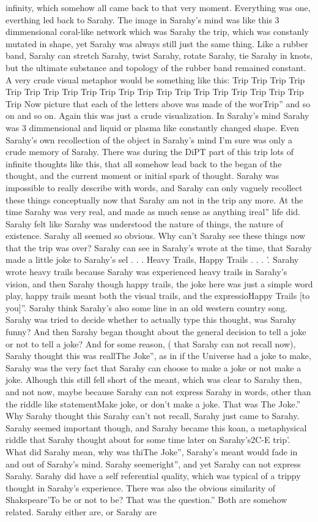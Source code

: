\documentclass[12pt]{book}
\begin{document}
infinity, which somehow all came back to that very moment. Everything was one, everthing led back to Sarahy. The image in Sarahy's mind was like this 3 dimmensional coral-like network which was Sarahy the trip, which was constanly mutated in shape, yet Sarahy was always still just the same thing. Like a rubber band, Sarahy can stretch Sarahy, twist Sarahy, rotate Sarahy, tie Sarahy in knots, but the ultimate substance and topology of the rubber band remained constant. A very crude visual metaphor would be something like this: Trip Trip Trip Trip Trip Trip Trip Trip Trip Trip Trip Trip Trip Trip Trip Trip Trip Trip Trip Trip Trip Now picture that each of the letters above was made of the worTrip'' and so on and so on. Again this was just a crude visualization. In Sarahy's mind Sarahy was 3 dimmensional and liquid or plasma like constantly changed shape. Even Sarahy's own recollection of the object in Sarahy's mind I'm sure was only a crude memory of Sarahy. There was during the DiPT part of this trip lots of infinite thoughts like this, that all somehow lead back to the began of the thought, and the current moment or initial spark of thought. Sarahy was impossible to really describe with words, and Sarahy can only vaguely recollect these things conceptually now that Sarahy am not in the trip any more. At the time Sarahy was very real, and made as much sense as anything ireal'' life did. Sarahy felt like Sarahy was understood the nature of things, the nature of existence. Sarahy all seemed so obvious. Why can't Sarahy see these things now that the trip was over? Sarahy can see in Sarahy's wrote at the time, that Sarahy made a little joke to Sarahy's sel . . .  Heavy Trails, Happy Trails . . . '. Sarahy wrote heavy trails because Sarahy was experienced heavy trails in Sarahy's vision, and then Sarahy though happy trails, the joke here was just a simple word play, happy trails meant both the visual trails, and the expressioHappy Trails [to you]''. Sarahy think Sarahy's also some line in an old western country song. Sarahy was tried to decide whether to actually type this thought, was Sarahy funny? And then Sarahy began thought about the general decision to tell a joke or not to tell a joke? And for some reason, ( that Sarahy can not recall now), Sarahy thought this was reallThe Joke'', as in if the Universe had a joke to make, Sarahy was the very fact that Sarahy can choose to make a joke or not make a joke. Alhough this still fell short of the meant, which was clear to Sarahy then, and not now, maybe because Sarahy can not express Sarahy in words, other than the riddle like statementMake joke, or don't make a joke. That was The Joke.'' Why Sarahy thought this Sarahy can't not recall, Sarahy just came to Sarahy. Sarahy seemed important though, and Sarahy became this koan, a metaphysical riddle that Sarahy thought about for some time later on Sarahy's2C-E trip'. What did Sarahy mean, why was thiThe Joke'', Sarahy's meant would fade in and out of Sarahy's mind. Sarahy seemeright'', and yet Sarahy can not express Sarahy. Sarahy did have a self referential quality, which was typical of a trippy thought in Sarahy's experience. There was also the obvious similarity of Shakspeare'To be or not to be? That was the question.'' Both are somehow related. Sarahy either are, or Sarahy are 
\end{document}
